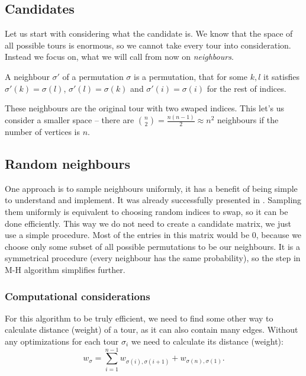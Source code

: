 \subsection{Candidates}
	Let us start with considering what the candidate is. We know that the space of all possible tours is enormous, so we cannot take every tour into consideration. Instead we focus on, what we will call from now on \textit{neighbours}.
	\begin{definition}
		A neighbour $\sigma'$ of a permutation $\sigma$ is a permutation, that for some $k, l$ it satisfies $\sigma'(k) = \sigma(l)$, $\sigma'(l) = \sigma(k)$ and $\sigma'(i) = \sigma(i)$ for the rest of indices.
	\end{definition}
	These neighbours are the original tour with two swaped indices. This let's us consider a smaller space -- there are $\binom{n}{2} = \frac{n(n-1)}{2} \approx n^2$ neighbours if the number of vertices is $n$.

\subsection{Random neighbours}
	One approach is to sample neighbours uniformly, it has a benefit of being simple to understand and implement. It was already successfully presented in \cite{decryption_tsp_MCMC}. Sampling them uniformly is equivalent to choosing random indices to swap, so it can be done efficiently. This way we do not need to create a candidate matrix, we just use a simple procedure. Most of the entries in this matrix would be $0$, because we choose only some subset of all possible permutations to be our neighbours. It is a symmetrical procedure (every neighbour has the same probability), so the step in M-H algorithm simplifies further.
	
	\subsubsection{Computational considerations}
		For this algorithm to be truly efficient, we need to find some other way to calculate distance (weight) of a tour, as it can also contain many edges. Without any optimizations for each tour $\sigma_i$ we need to calculate its distance (weight):
		\begin{equation*}
			w_\sigma = \sum_{i=1}^{n-1} w_{\sigma(i), \sigma(i+1)} + w_{\sigma(n), \sigma(1)}.
		\end{equation*}
		
